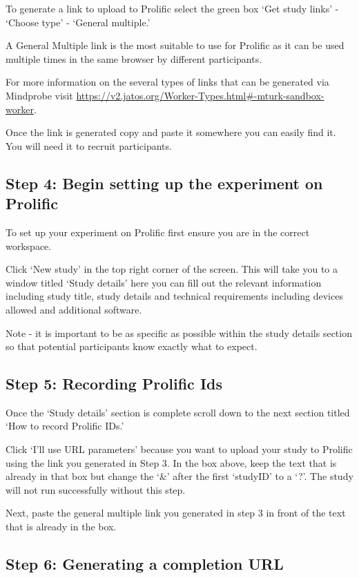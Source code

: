 \documentclass[
  12pt,
]{book}
\begin{document}
To generate a link to upload to Prolific select the green box `Get study links' - `Choose type' - `General multiple.'

A General Multiple link is the most suitable to use for Prolific as it can be used multiple times in the same browser by different participants.

For more information on the several types of links that can be generated via Mindprobe visit
\url{https://v2.jatos.org/Worker-Types.html\#-mturk-sandbox-worker}.

Once the link is generated copy and paste it somewhere you can easily find it. You will need it to recruit participants.

\subsection{Step 4: Begin setting up the experiment on Prolific}\label{step-4-begin-setting-up-the-experiment-on-prolific}

To set up your experiment on Prolific first ensure you are in the correct workspace.

Click `New study' in the top right corner of the screen. This will take you to a window titled `Study details' here you can fill out the relevant information including study title, study details and technical requirements including devices allowed and additional software.

Note - it is important to be as specific as possible within the study details section so that potential participants know exactly what to expect.

\subsection{Step 5: Recording Prolific Ids}\label{step-5-recording-prolific-ids}

Once the `Study details' section is complete scroll down to the next section titled `How to record Prolific IDs.'

Click `I'll use URL parameters' because you want to upload your study to Prolific using the link you generated in Step 3.
In the box above, keep the text that is already in that box but change the `\&' after the first `studyID' to a `?'. The study will not run successfully without this step.

Next, paste the general multiple link you generated in step 3 in front of the text that is already in the box.

\subsection{Step 6: Generating a completion URL}\label{step-6-generating-a-completion-url}
\end{document}
